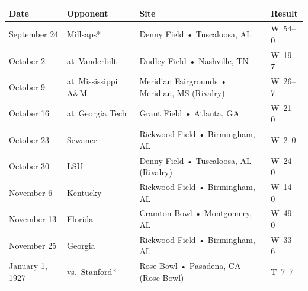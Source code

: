 \documentclass{article}
\begin{document}
\begin{tabular}{llll}
\toprule
Date & Opponent & Site & Result \\
\midrule
September 24 & Millsaps* & Denny Field • Tuscaloosa, AL & W 54–0 \\
October 2 & at Vanderbilt & Dudley Field • Nashville, TN & W 19–7 \\
October 9 & at Mississippi A\&M & Meridian Fairgrounds • Meridian, MS (Rivalry) & W 26–7 \\
October 16 & at Georgia Tech & Grant Field • Atlanta, GA & W 21–0 \\
October 23 & Sewanee & Rickwood Field • Birmingham, AL & W 2–0 \\
October 30 & LSU & Denny Field • Tuscaloosa, AL (Rivalry) & W 24–0 \\
November 6 & Kentucky & Rickwood Field • Birmingham, AL & W 14–0 \\
November 13 & Florida & Cramton Bowl • Montgomery, AL & W 49–0 \\
November 25 & Georgia & Rickwood Field • Birmingham, AL & W 33–6 \\
January 1, 1927 & vs. Stanford* & Rose Bowl • Pasadena, CA (Rose Bowl) & T 7–7 \\
\bottomrule
\end{tabular}
\end{document}
